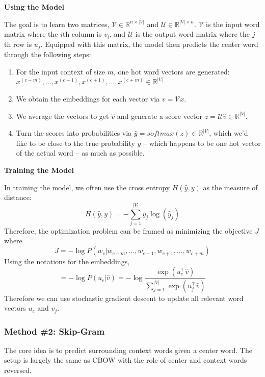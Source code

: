 \documentclass[
]{book}
\providecommand{\tightlist}{%
  \setlength{\itemsep}{0pt}\setlength{\parskip}{0pt}}
\begin{document}
\textbf{Using the Model }

The goal is to learn two matrices, \(\mathcal{V}\in\mathbb{R}^{n\times|V|}\) and \(\mathcal{U}\in\mathbb{R}^{|V|\times n}\). \(\mathcal{V}\) is the input word matrix where the \(i\)th column is \(v_i\), and \(\mathcal{U}\) is the output word matrix where the \(j\)th row is \(u_j\). Equipped with this matrix, the model then predicts the center word through the following steps:

\begin{enumerate}
\def\labelenumi{\arabic{enumi}.}
\tightlist
\item
  For the input context of size \(m\), one hot word vectors are generated: \(x^{(c-m)}, ..., x^{(c-1)},x^{(c+1)},...,x^{(c+m)}\in\mathbb{R}^{|V|}\)
\item
  We obtain the embeddings for each vector via \(v = \mathcal{V}x\).
\item
  We average the vectors to get \(\hat{v}\) and generate a score vector \(z=\mathcal{U}\hat{v}\in\mathbb{R}^{|V|}\).
\item
  Turn the scores into probabilities via \(\hat{y} = softmax(z) \in\mathbb{R}^{|V|}\), which we'd like to be close to the true probability \(y\) -- which happens to be one hot vector of the actual word -- as much as possible.
\end{enumerate}

\textbf{Training the Model}

In training the model, we often use the cross entropy \(H(\hat{y}, y)\) as the measure of distance:
\[
H(\hat{y}, y) = - \sum_{j=1}^{|V|} y_j \log (\hat{y}_j)
\]
Therefore, the optimization problem can be framed as minimizing the objective \(J\) where
\[
J = -\log P(w_c|w_{c-m}, ..., w_{c-1}, w_{c+1}, ..., w_{c+m})
\]
Using the notations for the embeddings,
\[
=-\log P(u_c|\hat{v}) = -\log \frac{\exp(u_c^\top \hat{v})}{\sum_{j=1}^{|V|} \exp(u_j^\top \hat{v})}
\]
Therefore we can use stochastic gradient descent to update all relevant word vectors \(u_c\) and \(v_j\).

\hypertarget{method-2-skip-gram}{%
\subsubsection{Method \#2: Skip-Gram}\label{method-2-skip-gram}}

The core idea is to predict surrounding context words given a center word. The setup is largely the same as CBOW with the role of center and context words reversed.
\end{document}
